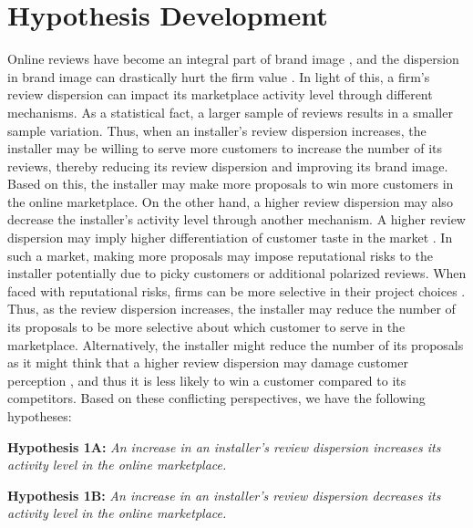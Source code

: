 \documentclass[msom,blindrev]{informs3}
\begin{document}
	
	
	\section{Hypothesis Development} \label{Sec: Hypothesis}
	
	
	
	Online reviews have become an integral part of brand image \citep{chakraborty2018credibility,chakraborty2018effects}, and the dispersion in brand image can drastically hurt the firm value \citep{luo2013impact}. In light of this, a firm's review dispersion can impact its marketplace activity level through different mechanisms. As a statistical fact, a larger sample of reviews results in a smaller sample variation. Thus, when an installer's review dispersion increases, the installer may be willing to serve more customers to increase the number of its reviews, thereby reducing its review dispersion and improving its brand image. Based on this, the installer may make more proposals to win more customers in the online marketplace. On the other hand, a higher review dispersion may also decrease the installer's activity level through another mechanism. A higher review dispersion may imply higher differentiation of customer taste in the market \citep{clemons2006online}. In such a market, making more proposals may impose reputational risks to the installer potentially due to picky customers or additional polarized reviews. When faced with reputational risks, firms can be more selective in their project choices \citep{demirag2011risks,hirshleifer1992managerial}. Thus, as the review dispersion increases, the installer may reduce the number of its proposals to be more selective about which customer to serve in the marketplace. Alternatively, the installer might reduce the number of its proposals as it might think that a higher review dispersion may damage customer perception \citep{Zhu}, and thus it is less likely to win a customer compared to its competitors. Based on these conflicting perspectives, we have the following hypotheses:
	
	
	\noindent\textbf{Hypothesis 1A:} \emph{An increase in an installer's review dispersion increases its activity level in the online marketplace.}
	
	\noindent\textbf{Hypothesis 1B:} \emph{An increase in an installer's review dispersion decreases its activity level in the online marketplace.}
	
\end{document}
